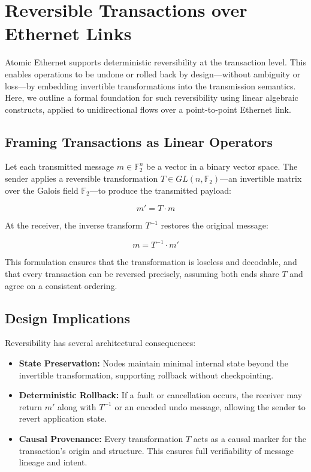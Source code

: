 \documentclass[../../../OAE-SPEC-MAIN.tex]{subfiles}
\begin{document}
\section{Reversible Transactions over Ethernet Links}

Atomic Ethernet supports deterministic reversibility at the transaction level. This enables operations to be undone or rolled back by design—without ambiguity or loss—by embedding invertible transformations into the transmission semantics. Here, we outline a formal foundation for such reversibility using linear algebraic constructs, applied to unidirectional flows over a point-to-point Ethernet link.

\subsection{Framing Transactions as Linear Operators}

Let each transmitted message $m \in \mathbb{F}_2^n$ be a vector in a binary vector space. The sender applies a reversible transformation $T \in GL(n, \mathbb{F}_2)$—an invertible matrix over the Galois field $\mathbb{F}_2$—to produce the transmitted payload:

\[
m' = T \cdot m
\]

At the receiver, the inverse transform $T^{-1}$ restores the original message:

\[
m = T^{-1} \cdot m'
\]

This formulation ensures that the transformation is loseless and decodable, and that every transaction can be reversed precisely, assuming both ends share $T$ and agree on a consistent ordering.

\subsection{Design Implications}

Reversibility has several architectural consequences:

\begin{itemize}
  \item \textbf{State Preservation:} Nodes maintain minimal internal state beyond the invertible transformation, supporting rollback without checkpointing.
  \item \textbf{Deterministic Rollback:} If a fault or cancellation occurs, the receiver may return $m'$ along with $T^{-1}$ or an encoded undo message, allowing the sender to revert application state.
  \item \textbf{Causal Provenance:} Every transformation $T$ acts as a causal marker for the transaction's origin and structure. This ensures full verifiability of message lineage and intent.
\end{itemize}
\end{document}
